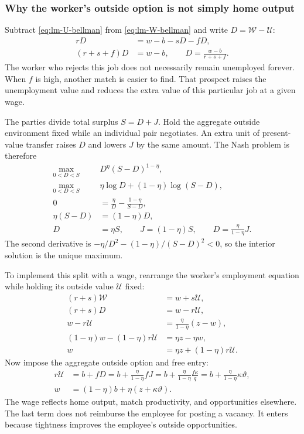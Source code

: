 \subsubsection{Why the worker's outside option is not simply home output}

Subtract \eqref{eq:lm-U-bellman} from \eqref{eq:lm-W-bellman} and write
$D=\mathcal W-\mathcal U$:
\begin{align}
 rD&=w-b-sD-fD,\\
 (r+s+f)D&=w-b,\qquad D=\frac{w-b}{r+s+f}.
 \label{eq:lm-worker-surplus}
\end{align}
The worker who rejects this job does not necessarily remain unemployed forever.
When $f$ is high, another match is easier to find. That prospect raises the
unemployment value and reduces the extra value of this particular job at a
given wage.

The parties divide total surplus $S=D+J$. Hold the aggregate outside
environment fixed while an individual pair negotiates. An extra unit of
present-value transfer raises $D$ and lowers $J$ by the same amount. The Nash
problem is therefore
\begin{align}
 \max_{0<D<S}\quad &D^\eta(S-D)^{1-\eta},\\
 \max_{0<D<S}\quad &\eta\log D+(1-\eta)\log(S-D),\\
 0&=\frac\eta D-\frac{1-\eta}{S-D},\\
 \eta(S-D)&=(1-\eta)D,\\
 D&=\eta S,\qquad J=(1-\eta)S,\qquad
 D=\frac\eta{1-\eta}J.
 \label{eq:lm-nash-sharing}
\end{align}
The second derivative is $-\eta/D^2-(1-\eta)/(S-D)^2<0$, so the interior
solution is the unique maximum.

To implement this split with a wage, rearrange the worker's employment equation
while holding its outside value $\mathcal U$ fixed:
\begin{align}
 (r+s)\mathcal W&=w+s\mathcal U,\\
 (r+s)D&=w-r\mathcal U,\\
 w-r\mathcal U&=\frac\eta{1-\eta}(z-w),\\
 (1-\eta)w-(1-\eta)r\mathcal U&=\eta z-\eta w,\\
 w&=\eta z+(1-\eta)r\mathcal U.
\end{align}
Now impose the aggregate outside option and free entry:
\begin{align}
 r\mathcal U
 &=b+fD
  =b+\frac\eta{1-\eta}fJ
  =b+\frac\eta{1-\eta}\frac{f\kappa}{q}
  =b+\frac\eta{1-\eta}\kappa\vartheta,\\
 w&=(1-\eta)b+\eta(z+\kappa\vartheta).
 \label{eq:lm-nash-wage}
\end{align}
The wage reflects home output, match productivity, and opportunities elsewhere.
The last term does not reimburse the employee for posting a vacancy. It enters
because tightness improves the employee's outside opportunities.

